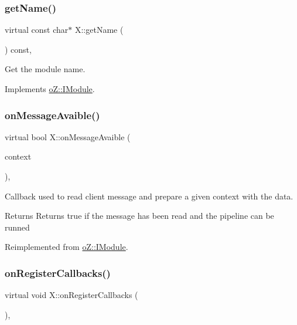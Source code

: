\subsubsection{\texorpdfstring{getName()}{getName()}}
{\footnotesize\ttfamily virtual const char$\ast$ X\+::get\+Name (\begin{DoxyParamCaption}\item[{void}]{ }\end{DoxyParamCaption}) const\hspace{0.3cm}{\ttfamily [inline]}, {\ttfamily [virtual]}}



Get the module name. 



Implements \mbox{\hyperlink{classo_z_1_1_i_module_af41d45158fd28e1bd86a34e25f5282d6}{o\+Z\+::\+I\+Module}}.

\mbox{\label{class_x_a5ca389f4b8f8ffb518cc37336f212118}} 
\subsubsection{\texorpdfstring{onMessageAvaible()}{onMessageAvailable()}}
{\footnotesize\ttfamily virtual bool X\+::on\+Message\+Avaible (\begin{DoxyParamCaption}\item[{\mbox{\hyperlink{classo_z_1_1_context}{o\+Z\+::\+Context}} \&}]{context }\end{DoxyParamCaption})\hspace{0.3cm}{\ttfamily [inline]}, {\ttfamily [virtual]}}



Callback used to read client message and prepare a given context with the data. 

\begin{DoxyReturn}{Returns}
Returns true if the message has been read and the pipeline can be runned 
\end{DoxyReturn}


Reimplemented from \mbox{\hyperlink{classo_z_1_1_i_module_ae7f25d557f48e4117979818ec89b9e12}{o\+Z\+::\+I\+Module}}.

\mbox{\label{class_x_a15a956080c7158b8979f2a674ca28443}} 
\subsubsection{\texorpdfstring{onRegisterCallbacks()}{onRegisterCallbacks()}}
{\footnotesize\ttfamily virtual void X\+::on\+Register\+Callbacks (\begin{DoxyParamCaption}\item[{\mbox{\hyperlink{classo_z_1_1_pipeline}{Pipeline}} \&}]{ }\end{DoxyParamCaption})\hspace{0.3cm}{\ttfamily [inline]}, {\ttfamily [virtual]}}



